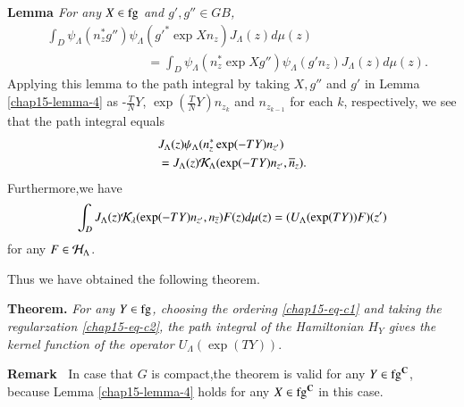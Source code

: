 \medskip
\noindent
{\bfseries Lemma  \label{chap15-lemma-4}} \textit{For any $X \in \operatorname{fg}$ and $g', g'' \in GB$,}
\begin{equation*}
\begin{split}
&\int_{D}\psi_{\Lambda}(n_{z}^{*}g'')\psi_{\Lambda}(g'^{*} \exp Xn_{z})J_{\Lambda}(z)d\mu(z)\\
&\qquad \qquad \qquad \qquad =\int_{D}\psi_{\Lambda}(n_{z}^{*} \exp Xg'')\psi_{\Lambda}(g'n_{z})J_{\Lambda}(z)d \mu(z).
\end{split}
\end{equation*}
Applying this lemma to the path integral by taking $X, g''$ and $g'$ in Lemma \ref{chap15-lemma-4} as -$\frac{T}{N}Y$, $\exp \left(\frac{T}{N}Y\right)n_{z_{k}}$ and $n_{z_{k-1}}$ for each $k$, respectively, we see that the path integral equals
\begin{align*}
&J_{\Lambda}(z)\psi_{\Lambda}(n_{z}^{*}\exp(-TY)n_{z'})\\
&=J_{\Lambda}(z)\mathcal{K}_{\Lambda}(\exp(-TY)n_{z'}, \overline{n}_{z}).
\end{align*}
Furthermore,\pageoriginale we have
\begin{equation*}
\int_{D}J_{\Lambda}(z)\mathcal{K}_{\lambda}(\exp(-TY)n_{z'}, n_{\overline{z}})F(z)d\mu(z)= (U_{\Lambda}(\exp(TY))F)(z')
\end{equation*}
for any $F \in \mathcal{H}_{\Lambda}$.

Thus we have obtained the following theorem.

\medskip
\noindent
{\bfseries Theorem.} \textit{For any $Y \in \operatorname{fg}$, choosing the ordering \eqref{chap15-eq-c1} and taking the regularzation \eqref{chap15-eq-c2}, the path integral of the Hamiltonian $H_{Y}$ gives the kernel function of the operator $U_{\Lambda}(\exp(TY))$}.

\medskip
\noindent
{\bfseries Remark  \label{chap15-remark-2}}~In case that $G$ is compact,the theorem is valid for any $Y \in \operatorname{fg}^{\mathbf{C}}$, because Lemma \ref{chap15-lemma-4} holds for any $X\in \operatorname{fg}^{\mathbf{C}}$  in this case.

